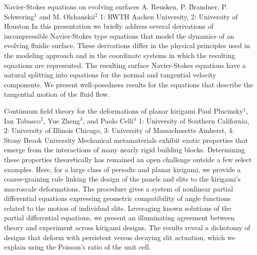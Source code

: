 \vspace{1.5ex}
\abs
{Navier-Stokes equations on evolving surfaces}
{A. Reusken, P. Brandner, P. Schwering$^{1}$ and M. Olshanskii$^{2}$}
{1: RWTH Aachen University, 2: University of Houston}
{In this presentation we briefly address several derivations of
incompressible Navier-Stokes type equations that model the dynamics of an
evolving fluidic surface. These derivations differ
in the physical principles used in the modeling approach and in the
coordinate systems in which the resulting equations are represented.
The resulting surface Navier-Stokes equations have a natural splitting
into equations for the normal and tangential velocity  components.
We  present well-posedness results for the equations that describe the
tangential motion of the fluid flow.}


\vspace{1.5ex}
\abs
{Continuum field theory for the deformations of planar kirigami}
{Paul Plucinsky$^1$, Ian Tobasco$^2$, Yue Zheng$^3$, and Paolo Celli$^4$}
{1: University of Southern California, 2: University of Illinois Chicago, 3: University of Massachusetts Amherst, 4: Stony Brook University}
{Mechanical metamaterials exhibit exotic properties that emerge from the interactions of many nearly rigid building blocks.
Determining these properties theoretically has remained an open challenge outside a few select examples.
Here, for a large class of periodic and planar kirigami, we provide a coarse-graining rule linking the design of the panels and slits to the kirigami’s macroscale deformations.
The procedure gives a system of nonlinear partial differential equations expressing geometric compatibility of angle functions related to the motion of individual slits.
Leveraging known solutions of the partial differential equations, we present an illuminating agreement between theory and experiment across kirigami designs.
The results reveal a dichotomy of designs that deform with persistent versus decaying slit actuation, which we explain using the Poisson’s ratio of the unit cell.}


